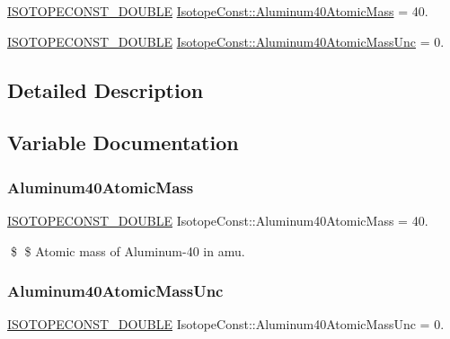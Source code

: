 \begin{DoxyCompactItemize}
\item 
\mbox{\hyperlink{group___isotope_const-_macros_ga8f45a7272ce02c0b4c65c44636ed719a}{I\+S\+O\+T\+O\+P\+E\+C\+O\+N\+S\+T\+\_\+\+D\+O\+U\+B\+LE}} \mbox{\hyperlink{group___isotope_const-_aluminum-_al40_gaa6a1dcc00a3fd75bf3caf33d9647d67f}{Isotope\+Const\+::\+Aluminum40\+Atomic\+Mass}} = 40.
\item 
\mbox{\hyperlink{group___isotope_const-_macros_ga8f45a7272ce02c0b4c65c44636ed719a}{I\+S\+O\+T\+O\+P\+E\+C\+O\+N\+S\+T\+\_\+\+D\+O\+U\+B\+LE}} \mbox{\hyperlink{group___isotope_const-_aluminum-_al40_gafa76c7507e83547eccb83712bd20d612}{Isotope\+Const\+::\+Aluminum40\+Atomic\+Mass\+Unc}} = 0.
\end{DoxyCompactItemize}


\subsection{Detailed Description}


\subsection{Variable Documentation}
\mbox{\label{group___isotope_const-_aluminum-_al40_gaa6a1dcc00a3fd75bf3caf33d9647d67f}} 
\subsubsection{\texorpdfstring{Aluminum40\+Atomic\+Mass}{Aluminum40AtomicMass}}
{\footnotesize\ttfamily \mbox{\hyperlink{group___isotope_const-_macros_ga8f45a7272ce02c0b4c65c44636ed719a}{I\+S\+O\+T\+O\+P\+E\+C\+O\+N\+S\+T\+\_\+\+D\+O\+U\+B\+LE}} Isotope\+Const\+::\+Aluminum40\+Atomic\+Mass = 40.}

\$ \$ Atomic mass of Aluminum-\/40 in amu. \mbox{\label{group___isotope_const-_aluminum-_al40_gafa76c7507e83547eccb83712bd20d612}} 
\subsubsection{\texorpdfstring{Aluminum40\+Atomic\+Mass\+Unc}{Aluminum40AtomicMassUnc}}
{\footnotesize\ttfamily \mbox{\hyperlink{group___isotope_const-_macros_ga8f45a7272ce02c0b4c65c44636ed719a}{I\+S\+O\+T\+O\+P\+E\+C\+O\+N\+S\+T\+\_\+\+D\+O\+U\+B\+LE}} Isotope\+Const\+::\+Aluminum40\+Atomic\+Mass\+Unc = 0.}

